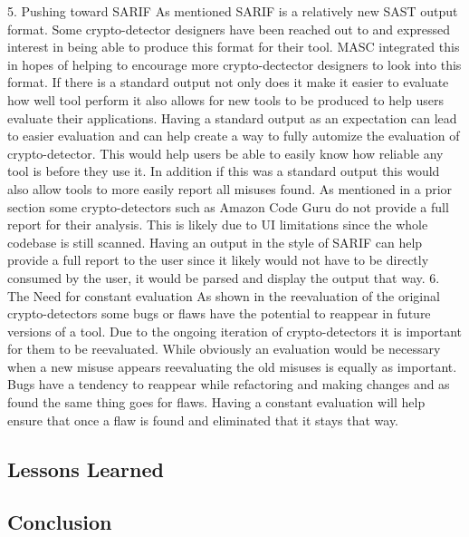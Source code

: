 5. Pushing toward SARIF
As mentioned SARIF is a relatively new SAST output format. Some crypto-detector designers have been reached out to and expressed interest in being able to produce this format for their tool. MASC integrated this in hopes of helping to encourage more crypto-dectector designers to look into this format. If there is a standard output not only does it make it easier to evaluate how well tool perform it also allows for new tools to be produced to help users evaluate their applications. Having a standard output as an expectation can lead to easier evaluation and can help create a way to fully automize the evaluation of crypto-detector. This would help users be able to easily know how reliable any tool is before they use it. In addition if this was a standard output this would also allow tools to more easily report all misuses found. As mentioned in a prior section some crypto-detectors such as Amazon Code Guru do not provide a full report for their analysis. This is likely due to UI limitations since the whole codebase is still scanned. Having an output in the style of SARIF can help provide a full report to the user since it likely would not have to be directly consumed by the user, it would be parsed and display the output that way. 
6. The Need for constant evaluation
As shown in the reevaluation of the original crypto-detectors some bugs or flaws have the potential to reappear in future versions of a tool. Due to the ongoing iteration of crypto-detectors it is important for them to be reevaluated. While obviously an evaluation would be necessary when a new misuse appears reevaluating the old misuses is equally as important. Bugs have a tendency to reappear while refactoring and making changes and as found the same thing goes for flaws. Having a constant evaluation will help ensure that once a flaw is found and eliminated that it stays that way.


\subsection{Lessons Learned}
\label{ch6:sec:lessons}


\subsection{Conclusion}
\label{ch6:sec:conclusion}

